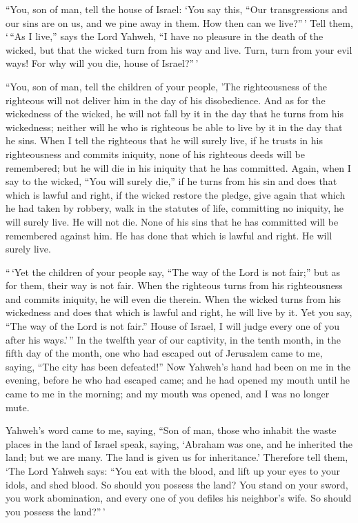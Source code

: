  ``You, son of man, tell the house of Israel: `You say
this, ``Our transgressions and our sins are on us, and we pine away in
them. How then can we live?''\,'  Tell them, `\,``As I
live,'' says the Lord Yahweh, ``I have no pleasure in the death of the
wicked, but that the wicked turn from his way and live. Turn, turn from
your evil ways! For why will you die, house of Israel?''\,'

 ``You, son of man, tell the children of your people,
'The righteousness of the righteous will not deliver him in the day of
his disobedience. And as for the wickedness of the wicked, he will not
fall by it in the day that he turns from his wickedness; neither will he
who is righteous be able to live by it in the day that he sins.
 When I tell the righteous that he will surely live, if
he trusts in his righteousness and commits iniquity, none of his
righteous deeds will be remembered; but he will die in his iniquity that
he has committed.  Again, when I say to the wicked, ``You
will surely die,'' if he turns from his sin and does that which is
lawful and right,  if the wicked restore the pledge, give
again that which he had taken by robbery, walk in the statutes of life,
committing no iniquity, he will surely live. He will not die.
 None of his sins that he has committed will be
remembered against him. He has done that which is lawful and right. He
will surely live.

 ``\,`Yet the children of your people say, ``The way of
the Lord is not fair;'' but as for them, their way is not fair.
 When the righteous turns from his righteousness and
commits iniquity, he will even die therein.  When the
wicked turns from his wickedness and does that which is lawful and
right, he will live by it.  Yet you say, ``The way of the
Lord is not fair.'' House of Israel, I will judge every one of you after
his ways.'\,''  In the twelfth year of our captivity, in
the tenth month, in the fifth day of the month, one who had escaped out
of Jerusalem came to me, saying, ``The city has been defeated!''
 Now Yahweh's hand had been on me in the evening, before
he who had escaped came; and he had opened my mouth until he came to me
in the morning; and my mouth was opened, and I was no longer mute.

 Yahweh's word came to me, saying,  ``Son
of man, those who inhabit the waste places in the land of Israel speak,
saying, `Abraham was one, and he inherited the land; but we are many.
The land is given us for inheritance.'  Therefore tell
them, `The Lord Yahweh says: ``You eat with the blood, and lift up your
eyes to your idols, and shed blood. So should you possess the land?
 You stand on your sword, you work abomination, and every
one of you defiles his neighbor's wife. So should you possess the
land?''\,'

